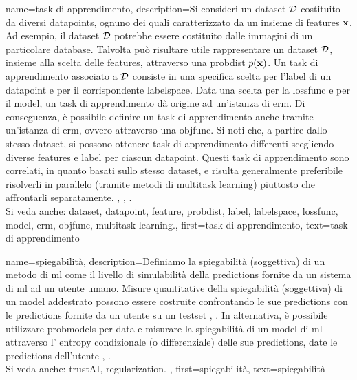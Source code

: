 {name={task di apprendimento}, 
	description={Si consideri  un \gls{dataset} $\mathcal{D}$ costituito da diversi \glspl{datapoint}, ognuno dei quali
	 	caratterizzato da un insieme di \glspl{feature} ${\bf x}$. Ad esempio, il \gls{dataset} $\mathcal{D}$ 
	 	potrebbe essere costituito dalle immagini di un particolare database. Talvolta può risultare 
		utile rappresentare un \gls{dataset} $\mathcal{D}$, insieme alla scelta delle \glspl{feature}, attraverso una \gls{probdist} $p({\bf x})$. 
	 	Un task di apprendimento associato a $\mathcal{D}$ consiste in una specifica  
	 	scelta per l'\gls{label} di un \gls{datapoint} e per il corrispondente \gls{labelspace}. 
	 	Data una scelta per la \gls{lossfunc} e per il \gls{model}, un task di apprendimento dà origine ad 
		un'istanza di \gls{erm}. Di conseguenza, è possibile definire un task di apprendimento anche tramite un'istanza di \gls{erm}, 
		ovvero attraverso una \gls{objfunc}. Si noti che, a partire dallo stesso \gls{dataset}, si possono ottenere task di apprendimento differenti 
	 	scegliendo diverse \glspl{feature} e \gls{label} per ciascun \gls{datapoint}. Questi  
	 	task di apprendimento sono correlati, in quanto basati sullo stesso \gls{dataset}, e risulta generalmente preferibile 
		risolverli in parallelo (tramite metodi di \gls{multitask learning}) piuttosto che affrontarli separatamente. \cite{Caruana:1997wk}, \cite{JungGaphLassoSPL}, \cite{CSGraphSelJournal}.
	 			\\ 
		Si veda anche: \gls{dataset}, \gls{datapoint}, \gls{feature}, \gls{probdist}, \gls{label}, \gls{labelspace}, \gls{lossfunc}, \gls{model}, \gls{erm}, \gls{objfunc}, \gls{multitask learning}.},
	first={task di apprendimento},
	text={task di apprendimento}
}

{name={spiegabilità},
	description={Definiamo la spiegabilità (soggettiva) di un metodo di \gls{ml}  
		come il livello di simulabilità \cite{Colin:2022aa} della \glspl{prediction} 
		fornite da un sistema di \gls{ml} ad un utente umano. Misure quantitative della 
		spiegabilità (soggettiva) di un \gls{model} addestrato possono essere costruite
		confrontando le sue \glspl{prediction} con le \glspl{prediction} fornite da un utente 
		su un \gls{testset} \cite{Colin:2022aa}, \cite{Zhang:2024aa}. In alternativa, è possibile utilizzare 
		\glspl{probmodel} per \gls{data} e misurare la spiegabilità di un \gls{model} di \gls{ml} 
		 attraverso l' \gls{entropy} condizionale (o differenziale) delle sue \glspl{prediction}, date le \glspl{prediction} dell'utente \cite{JunXML2020}, \cite{Chen2018}.
						\\ 
		Si veda anche: \gls{trustAI}, \gls{regularization}.
		},
		first={spiegabilità},
		text={spiegabilità}
	}
	
